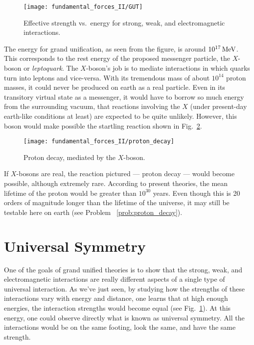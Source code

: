 \begin{figure}[tbp]
\begin{center}
\texttt{[image: fundamental\_forces\_II/GUT]}
\caption{Effective strength vs.\ energy for strong, weak, and
  electromagnetic interactions.}
\label{fig:GUT}
\end{center}
\end{figure}

The energy for grand unification, as seen from the figure, is around
$10^{17}\,\mbox{MeV}$. This corresponds to the rest energy of the proposed
messenger particle, the $X$-boson or {\em leptoquark}.  The
$X$-boson's job is to mediate interactions in which quarks turn into
leptons and vice-versa.  With its tremendous mass of about $10^{14}$
proton masses, it could never be produced on earth as a real particle.
Even in its transitory virtual state as a messenger, it would have to
borrow so much energy from the surrounding vacuum, that reactions
involving the $X$ (under present-day earth-like conditions at least)
are expected to be quite unlikely.  However, this boson would make
possible the startling reaction shown in Fig.~\ref{fig:proton_decay}.

\begin{figure}[tbp]
\begin{minipage}{7.5cm}
\caption{Proton decay, mediated by the $X$-boson.}
\label{fig:proton_decay}
\end{minipage}
\begin{minipage}{3cm}
\texttt{[image: fundamental\_forces\_II/proton\_decay]}
\end{minipage}
\end{figure}

If $X$-bosons are real, the reaction pictured --- proton decay ---
would become possible, although extremely rare.  According to present
theories, the mean lifetime of the proton would be greater than $10^{30}$
years.  Even though this is 20 orders of magnitude longer than the
lifetime of the universe, it may still be testable here on earth (see
Problem~
\ref{prob:proton_decay}).

\section{Universal Symmetry}
\label{sec:universal_symmetry}

One of the goals of grand unified theories is to show that the strong,
weak, and electromagnetic interactions are really different aspects of
a single type of universal interaction.  As we've just seen, by
studying how the strengths of these interactions vary with energy and
distance, one learns that at high enough energies, the interaction
strengths would become equal (see Fig.~\ref{fig:GUT}).  At this
energy, one could observe directly what is known as universal
symmetry.  All the interactions would be on the same footing, look the
same, and have the same strength.

